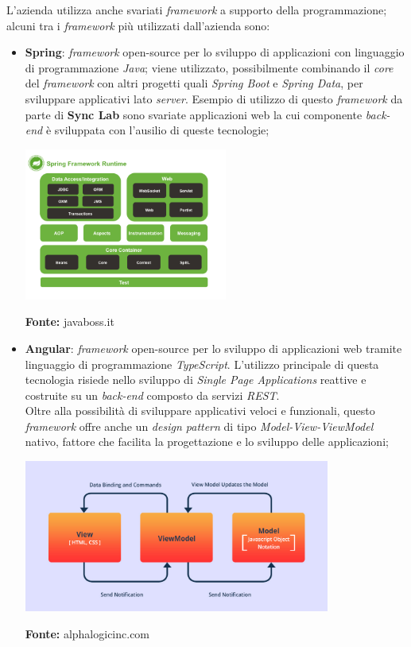 L'azienda utilizza anche svariati \textit{framework} a supporto della programmazione; alcuni tra i \textit{framework} più utilizzati dall'azienda sono:
\begin{itemize}
  \item \textbf{Spring}: \textit{framework} open-source per lo sviluppo di applicazioni con linguaggio di programmazione \textit{Java}; viene utilizzato, possibilmente combinando il \textit{core} del \textit{framework} con altri progetti quali \textit{Spring Boot} e \textit{Spring Data}, per sviluppare applicativi lato \textit{server}. Esempio di utilizzo di questo \textit{framework} da parte di \textbf{Sync Lab} sono svariate applicazioni web la cui componente \textit{back-end} è sviluppata con l'ausilio di queste tecnologie;

  \begin{minipage}{\linewidth}
    \centering
      \includegraphics[height=5cm]{immagini/spring}
    \caption*{\textbf{Fonte:} javaboss.it}
  \end{minipage}

  \item \textbf{Angular}: \textit{framework} open-source per lo sviluppo di applicazioni web tramite linguaggio di programmazione \textit{TypeScript}. L'utilizzo principale di questa tecnologia risiede nello sviluppo di \textit{Single Page Applications} reattive e costruite su un \textit{back-end} composto da servizi \textit{REST}. \\
  Oltre alla possibilità di sviluppare applicativi veloci e funzionali, questo \textit{framework} offre anche un \textit{design pattern} di tipo \textit{Model-View-ViewModel} nativo, fattore che facilita la progettazione e lo sviluppo delle applicazioni;

  \begin{minipage}{\linewidth}
    \centering
      \includegraphics[height=5cm]{immagini/angular}
    \caption*{\textbf{Fonte:} alphalogicinc.com}
  \end{minipage}


\end{itemize}
